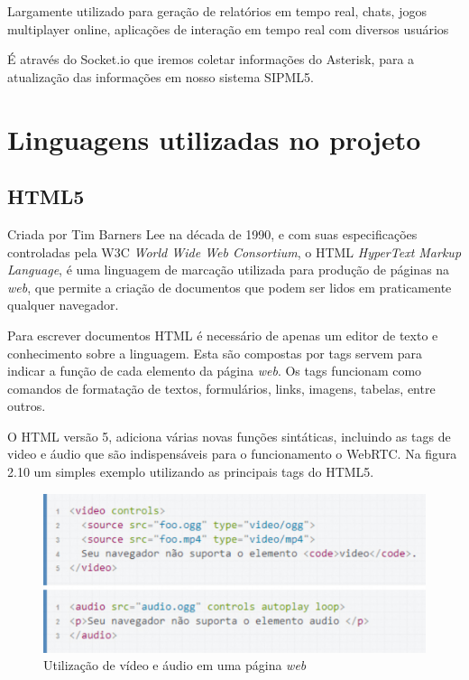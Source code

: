 \documentclass[12pt,a4paper,oneside]{report}
\begin{document}
Largamente utilizado para geração de relatórios em tempo real, chats, jogos multiplayer online, aplicações de interação em tempo real com diversos usuários 

É através do Socket.io que iremos coletar informações do Asterisk, para a atualização das informações em nosso sistema SIPML5.


\section{Linguagens utilizadas no projeto}
\label{s_linguagensProjeto}

\subsection{HTML5}
\label{ss_html5}
Criada por Tim Barners Lee na década de 1990, e com suas especificações controladas pela W3C \textit{World Wide Web Consortium}, o HTML \textit{HyperText Markup Language}, é uma linguagem  de marcação utilizada para produção de páginas na \textit{web}, que permite a criação de documentos que podem ser lidos em praticamente qualquer navegador.

Para escrever documentos HTML é necessário de apenas um editor de texto e conhecimento sobre a linguagem. Esta são compostas por tags servem para indicar a função de cada elemento da página \textit{web}. Os tags funcionam como comandos de formatação de textos, formulários, links, imagens, tabelas, entre outros.

O HTML versão 5, adiciona várias novas funções sintáticas, incluindo as tags de video e áudio que são indispensáveis para o funcionamento o WebRTC. Na figura 2.10 um simples exemplo utilizando as principais tags do HTML5.

\begin{figure}[!htdb]
 \centering
  \includegraphics[width = 1\linewidth]{images/html5}
  \caption{Utilização de vídeo e áudio em uma página \textit{web}} %
  \label{f_mediaStream}
\end{figure}
\end{document}
